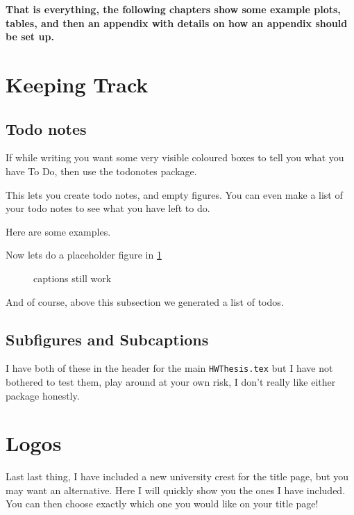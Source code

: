 \documentclass[../HWThesis.tex]{subfiles} %
\begin{document}
\begin{refsection}
\textbf{That is everything, the following chapters show some example plots, tables, and then an appendix with details on how an appendix should be set up.}

\section{Keeping Track}

\listoftodos

\subsection{Todo notes}

If while writing you want some very visible coloured boxes to tell you what you have To Do, then use the todonotes package. 

This lets you create todo notes, and empty figures. You can even make a list of your todo notes to see what you have left to do. 

Here are some examples. 

Now lets do a placeholder figure in \cref{fig: missing figure}
\begin{figure}[H]
\begin{center}
\caption{captions still work}
\label{fig: missing figure}%
\end{center}
\end{figure}

And of course, above this subsection we generated a list of todos.

\subsection{Subfigures and Subcaptions}
I have both of these in the header for the main \texttt{HWThesis.tex} but I have not bothered to test them, play around at your own risk, I don't really like either package honestly. 

\section{Logos}
Last last thing, I have included a new university crest for the title page, but you may want an alternative. Here I will quickly show you the ones I have included. You can then choose exactly which one you would like on your title page! 


\end{refsection}
\end{document}
